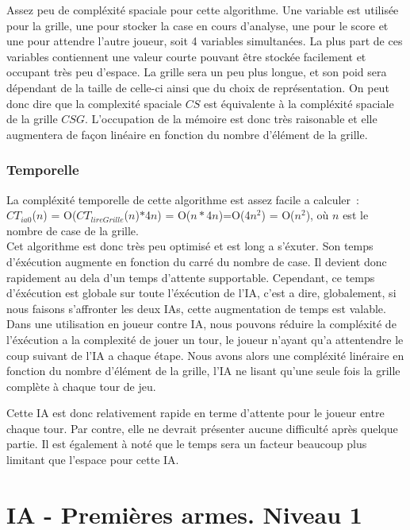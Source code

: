 \documentclass[a4paper,12pt]{report}
\begin{document}
Assez peu de compl\'exit\'e spaciale pour cette algorithme. Une variable est utilis\'ee pour la grille, une pour stocker la case en cours d'analyse, une pour le score et une pour attendre l'autre joueur, soit 4 variables simultan\'ees. La plus part de ces variables contiennent une valeur courte pouvant \^etre stock\'ee facilement et occupant tr\`es peu d'espace. La grille sera un peu plus longue, et son poid sera d\'ependant de la taille de celle-ci ainsi que du choix de repr\'esentation. On peut donc dire que la complexit\'e spaciale $CS$ est \'equivalente \`a la compl\'exit\'e spaciale de la grille $CSG$. L'occupation de la m\'emoire est donc tr\`es raisonable et elle augmentera de fa\c{c}on lin\'eaire en fonction du nombre d'\'el\'ement de la grille. 

\subsubsection{Temporelle}

La compl\'exit\'e temporelle de cette algorithme est assez facile a calculer~: \\
$CT_{ia0}$($n$) = O($CT_{lireGrille}$($n$)$*$4$n$) = O($n*$4$n$)=O(4$n^2$) = O($n^2$), o\`u $n$ est le nombre de case de la grille. \\
Cet algorithme est donc tr\`es peu optimis\'e et est long a s'\'exuter. Son temps d'\'ex\'ecution augmente en fonction du carr\'e du nombre de case. Il devient donc rapidement au dela d'un temps d'attente supportable. Cependant, ce temps d'\'ex\'ecution est globale sur toute l'\'ex\'ecution de l'IA, c'est a dire, globalement, si nous faisons s'affronter les deux IAs, cette augmentation de temps est valable. Dans une utilisation en joueur contre IA, nous pouvons r\'eduire la compl\'exit\'e de l'\'ex\'ecution a la complexit\'e de jouer un tour, le joueur n'ayant qu'a attentendre le coup suivant de l'IA a chaque \'etape. Nous avons alors une compl\'exit\'e lin\'eraire en fonction du nombre d'\'el\'ement de la grille, l'IA ne lisant qu'une seule fois la grille compl\`ete \`a chaque tour de jeu.

Cette IA est donc relativement rapide en terme d'attente pour le joueur entre chaque tour. Par contre, elle ne devrait pr\'esenter aucune difficult\'e apr\`es quelque partie. Il est \'egalement \`a not\'e que le temps sera un facteur beaucoup plus limitant que l'espace pour cette IA.

\section{IA - Premi\`eres armes. Niveau 1}
\end{document}
